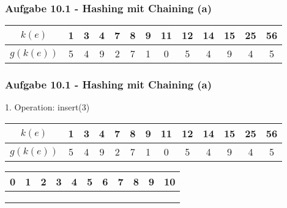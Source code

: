   \begin{frame}
    \frametitle{Aufgabe 10.1 - Hashing mit Chaining (a)}
  
    \begin{center}
      \begin{tabular}{c|c|c|c|c|c|c|c|c|c|c|c|c}
        $k(e)$    & 1 & 3 & 4 & 7 & 8 & 9 & 11 & 12 & 14 & 15 & 25 & 56 \\
        \hline
        $g(k(e))$ & 5 & 4 & 9 & 2 & 7 & 1 & 0  & 5  & 4  & 9  & 4  & 5  \\
      \end{tabular}
    \end{center}
  \end{frame}
  
  \begin{frame}
    \frametitle{Aufgabe 10.1 - Hashing mit Chaining (a)}
  
    1. Operation: insert(3)
  
    \begin{center}
      \begin{tabular}{c|c|c|c|c|c|c|c|c|c|c|c|c}
        $k(e)$    & 1 & 3 & 4 & 7 & 8 & 9 & 11 & 12 & 14 & 15 & 25 & 56 \\
        \hline
        $g(k(e))$ & 5 & 4 & 9 & 2 & 7 & 1 & 0  & 5  & 4  & 9  & 4  & 5  \\
      \end{tabular}
  
      \bigskip
  
      \begin{tabular}{c|c|c|c|c|c|c|c|c|c|c}
        0 & 1 & 2 & 3 & 4 & 5 & 6 & 7 & 8 & 9 & 10 \\
        \hline
          &   &   &   &   &   &   &   &   &   &    \\
          &   &   &   &   &   &   &   &   &   &    \\
          &   &   &   &   &   &   &   &   &   &    \\
      \end{tabular}
    \end{center}
  \end{frame}
  
